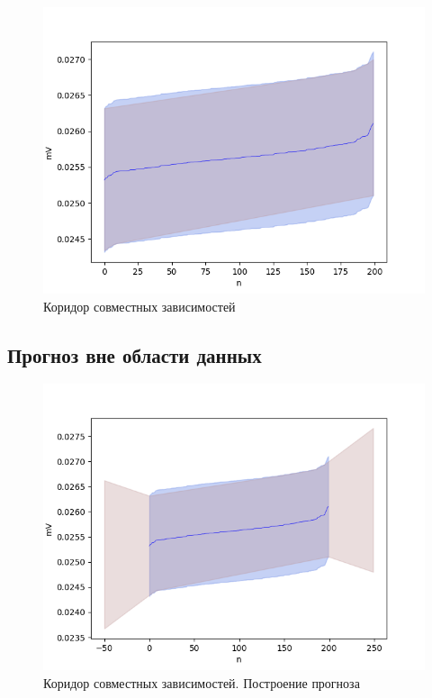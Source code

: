 \begin{figure}[H]
	\begin{center}
		\includegraphics[scale = 0.55]{corridor_of_joint_dependencies.png}
	\end{center}
	\caption{Коридор совместных зависимостей}
\end{figure}

\subsection{Прогноз вне области данных}

\begin{figure}[H]
	\begin{center}
		\includegraphics[scale = 0.55]{corridor_of_joint_dependencies_prediction.png}
	\end{center}
	\caption{Коридор совместных зависимостей. Построение прогноза}
\end{figure}



